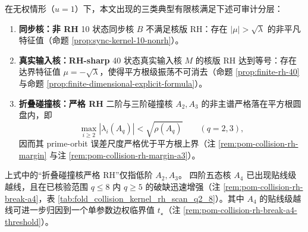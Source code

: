 \begin{proposition}\label{prop:rh-stratification-three-kernels}
在无权情形（$u=1$）下，本文出现的三类典型有限核满足下述可审计分层：
\begin{enumerate}
  \item \textbf{同步核：非 RH} 10 状态同步核 $B$ 不满足核版 RH：存在 \(|\mu|>\sqrt{\lambda}\) 的非平凡特征值（命题 \ref{prop:sync-kernel-10-nonrh}）。
  \item \textbf{真实输入核：RH-sharp} 40 状态真实输入核 $M$ 的核版 RH 达到等号：存在达界特征值 \(\mu=-\sqrt{\lambda}\)，使得平方根级振荡不可消去（命题 \ref{prop:finite-rh-40} 与命题 \ref{prop:finite-dimensional-explicit-formula}）。
  \item \textbf{折叠碰撞核：严格 RH} 二阶与三阶碰撞核 \(A_2,A_3\) 的非主谱严格落在平方根圆盘内，即
  \[
  \max_{i\ge 2}|\lambda_i(A_q)|<\sqrt{\rho(A_q)}\qquad(q=2,3),
  \]
  因而其 prime-orbit 误差尺度严格优于平方根上界（注 \ref{rem:pom-collision-rh-margin} 与注 \ref{rem:pom-collision-rh-margin-a3}）。
\end{enumerate}
\end{proposition}

\begin{remark}[高阶折叠碰撞核的 near-RH 越线：从 \texorpdfstring{$q=4$}{q=4} 起]\label{rem:collision-kernel-rh-break-q4}
上式中的“折叠碰撞核严格 RH”仅指低阶 \(A_2,A_3\)。
四阶五态核 \(A_4\) 已出现贴线级越线，且在已核验范围 \(q\le 8\) 内 \(q\ge 5\) 的破缺迅速增强（注 \ref{rem:pom-collision-rh-break-a4}，表 \ref{tab:fold_collision_kernel_rh_scan_q2_8}）。其中 \(A_4\) 的贴线级越线可进一步归因到一个单参数边权临界值 \(t_\star\)（注 \ref{rem:pom-collision-rh-break-a4-threshold}）。
\end{remark}

